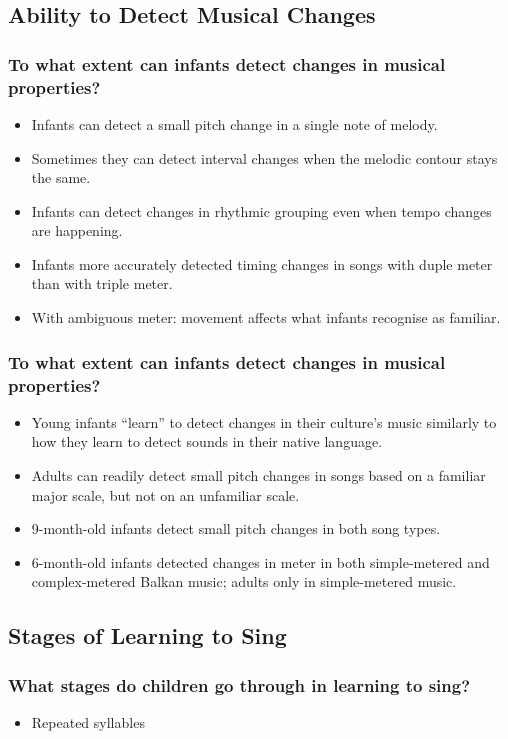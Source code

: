\documentclass{beamer}
\begin{document}
\subsection*{Ability to Detect Musical Changes}

\begin{frame}
	\frametitle{To what extent can infants detect changes in musical properties?}
	\begin{itemize}
		\item Infants can detect a small pitch change in a single note of melody.
		\item Sometimes they can detect interval changes when the melodic contour stays the same.
		\item Infants can detect changes in rhythmic grouping even when tempo changes are happening.
		\item Infants more accurately detected timing changes in songs with duple meter than with triple meter.
		\item With ambiguous meter: movement affects what infants recognise as familiar.
	\end{itemize}
\end{frame}

\begin{frame}
	\frametitle{To what extent can infants detect changes in musical properties?}
	\begin{itemize}
		\item Young infants ``learn'' to detect changes in their culture's music similarly to how they learn to detect sounds in their native language.
		\item Adults can readily detect small pitch changes in songs based on a familiar major scale, but not on an unfamiliar scale.
		\pause
		\item 9-month-old infants detect small pitch changes in both song types.
		\item 6-month-old infants detected changes in meter in both simple-metered and complex-metered Balkan music; adults only in simple-metered music.
	\end{itemize}
\end{frame}

\subsection*{Stages of Learning to Sing}

\begin{frame}
	\frametitle{What stages do children go through in learning to sing?}
	\begin{itemize}
		\item Repeated syllables
	\end{itemize}
\end{frame}
\end{document}
